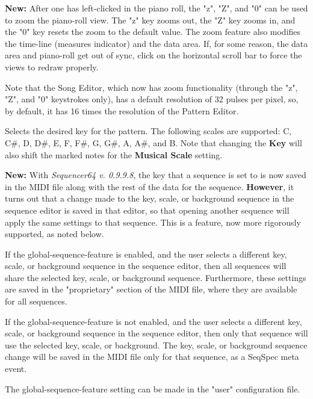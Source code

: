    \textbf{New:}
   After one has left-clicked in the piano roll, the "z", "Z", and "0"
   can be used to zoom the piano-roll view.  The "z" key zooms out, the "Z" key
   zooms in, and the "0" key resets the zoom to the default value.
   The zoom feature also modifies the time-line (measures indicator) and
   the data area.
   If, for some reason, the data area and piano-roll get out of sync, click on
   the horizontal scroll bar to force the views to redraw properly.

   Note that the Song Editor, which now has zoom functionality (through
   the "z", "Z", and "0" keystrokes only),
   has a default resolution of 32 pulses per pixel, so, by default, it has
   16 times the resolution of the Pattern Editor.

   Selects the desired key for the pattern.  The following scales are
   supported:  C, C\#, D, D\#, E, F, F\#, G, G\#, A, A\#, and B.
   Note that changing the \textbf{Key} will also shift the marked notes
   for the \textbf{Musical Scale} setting.

   \textbf{New:}
   With \textsl{Sequencer64 v. 0.9.9.8}, the key that a sequence is set to is
   now saved in the MIDI file along with the rest of the data for the sequence.
   \textbf{However},
   it turns out that a change made to the key, scale, or background sequence in
   the sequence editor is saved in that editor, so that opening another sequence
   will apply the same settings to that sequence.  This is a feature, now
   more rigorously supported, as noted below.

   If the global-sequence-feature is enabled, and the user selects
   a different key, scale, or background sequence in the sequence editor, 
   then all sequences will share the selected key, scale, or background
   sequence.  Furthermore, these settings are saved in the "proprietary"
   section of the MIDI file, where they are available for all sequences.

   If the global-sequence-feature is not enabled, and the user selects
   a different key, scale, or background sequence in the sequence editor, 
   then only that sequence will use the selected key, scale, or background.
   The key, scale, or background sequence change will be saved in the MIDI file
   only for that sequence, as a SeqSpec meta event.

   The global-sequence-feature setting can be made in the "user" configuration
   file.

